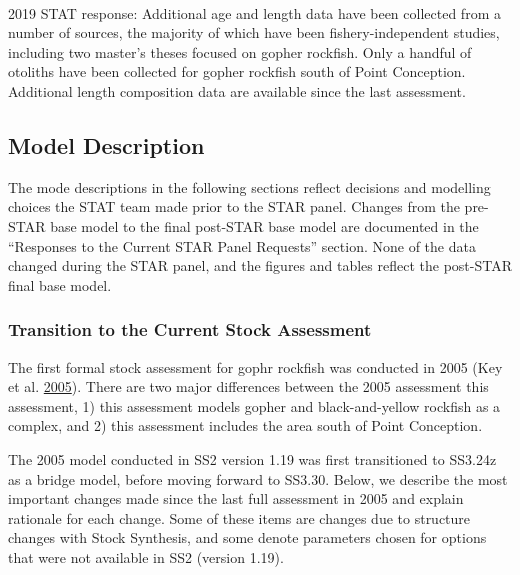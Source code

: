\documentclass[12pt,]{article}
\begin{document}
\begin{description}[style=unboxed]

  \item[Recommendation 1: Additional length and age composition data should be 
  collected for gopher rockfish. This would help to characterize spatial and possibly 
  temporal variation in growth] \hfill \\

   2019 STAT response: Additional age and length data have been collected from a number of 
   sources, the majority of which have been fishery-independent studies, including 
   two master's theses focused on gopher rockfish.  Only a handful of otoliths have been 
   collected for gopher rockfish south of Point Conception.  Additional length composition 
   data are available since the last assessment.
   
\end{description}

\subsection{Model Description}\label{model-description}

The mode descriptions in the following sections reflect decisions and
modelling choices the STAT team made prior to the STAR panel. Changes
from the pre-STAR base model to the final post-STAR base model are
documented in the ``Responses to the Current STAR Panel Requests''
section. None of the data changed during the STAR panel, and the figures
and tables reflect the post-STAR final base model.

\subsubsection{Transition to the Current Stock
Assessment}\label{transition-to-the-current-stock-assessment}

The first formal stock assessment for gophr rockfish was conducted in
2005 (Key et al. \protect\hyperlink{ref-Key2005}{2005}). There are two
major differences between the 2005 assessment this assessment, 1) this
assessment models gopher and black-and-yellow rockfish as a complex, and
2) this assessment includes the area south of Point Conception.

The 2005 model conducted in SS2 version 1.19 was first transitioned to
SS3.24z as a bridge model, before moving forward to SS3.30. Below, we
describe the most important changes made since the last full assessment
in 2005 and explain rationale for each change. Some of these items are
changes due to structure changes with Stock Synthesis, and some denote
parameters chosen for options that were not available in SS2 (version
1.19).
\end{document}
